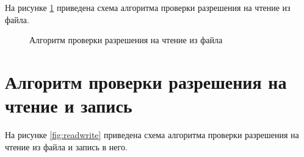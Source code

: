 На рисунке \ref{fig:rename} приведена схема алгоритма проверки разрешения на чтение из файла.

\begin{figure}[ph!]
	\caption{Алгоритм проверки разрешения на чтение из файла}
	\label{fig:rename}
\end{figure}

\section{Алгоритм проверки разрешения на чтение и запись}

На рисунке \ref{fig:readwrite} приведена схема алгоритма проверки разрешения на чтение из файла и запись в него.

